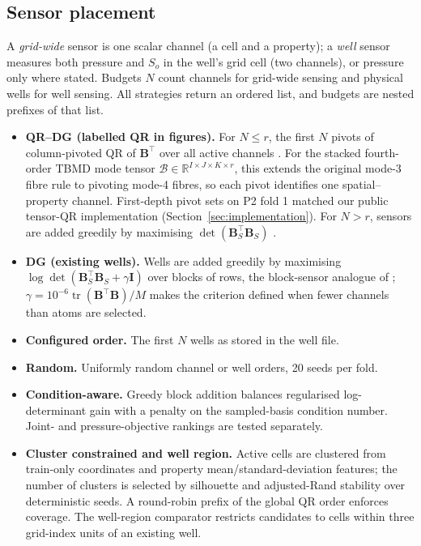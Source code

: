 \subsection{Sensor placement}
\label{sec:placement}
A \emph{grid-wide} sensor is one scalar channel (a cell and a property); a \emph{well} sensor measures both pressure and $S_o$ in the well's grid cell (two channels), or pressure only where stated. Budgets $N$ count channels for grid-wide sensing and physical wells for well sensing. All strategies return an ordered list, and budgets are nested prefixes of that list.
\begin{itemize}
\item \textbf{QR--DG (labelled QR in figures).} For $N\le r$, the first $N$ pivots of column-pivoted QR of $\mathbf{B}^\top$ over all active channels \cite{drmac2016,manohar2018}. For the stacked fourth-order TBMD mode tensor $\mathcal{B}\in\mathbb{R}^{I\times J\times K\times r}$, this extends the original mode-3 fibre rule \cite{zhong2024tbmd} to pivoting mode-4 fibres, so each pivot identifies one spatial--property channel. First-depth pivot sets on P2 fold 1 matched our public tensor-QR implementation (Section~\ref{sec:implementation}). For $N>r$, sensors are added greedily by maximising $\det(\mathbf{B}_S^\top\mathbf{B}_S)$ \cite{saito2021}.
\item \textbf{DG (existing wells).} Wells are added greedily by maximising $\log\det(\mathbf{B}_S^\top\mathbf{B}_S+\gamma\mathbf{I})$ over blocks of rows, the block-sensor analogue of \cite{saito2021,saito2020vector}; $\gamma=10^{-6}\operatorname{tr}(\mathbf{B}^\top\mathbf{B})/M$ makes the criterion defined when fewer channels than atoms are selected.
\item \textbf{Configured order.} The first $N$ wells as stored in the well file.
\item \textbf{Random.} Uniformly random channel or well orders, 20 seeds per fold.
\item \textbf{Condition-aware.} Greedy block addition balances regularised log-determinant gain with a penalty on the sampled-basis condition number. Joint- and pressure-objective rankings are tested separately.
\item \textbf{Cluster constrained and well region.} Active cells are clustered from train-only coordinates and property mean/standard-deviation features; the number of clusters is selected by silhouette and adjusted-Rand stability over deterministic seeds. A round-robin prefix of the global QR order enforces coverage. The well-region comparator restricts candidates to cells within three grid-index units of an existing well.
\end{itemize}


